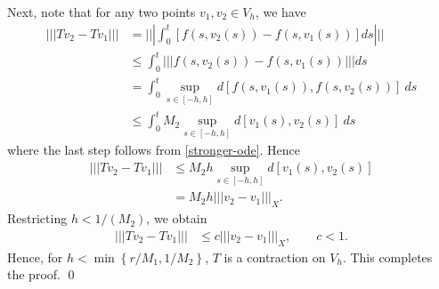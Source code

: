 \documentclass[12pt,reqno]{amsart}
\numberwithin{equation}{section}  %
\numberwithin{figure}{section}
\theoremstyle{plain}
\theoremstyle{definition}
\theoremstyle{remark}
\begin{document}
%
%
Next, note that for any two points $v_1, v_2 \in
V_h$, we have
%
%
\begin{equation}
	\label{cont-part-1}
	\begin{split}
		| | | Tv_2 - Tv_1 | | | 
		& = | | | \int_0^t \left[ f(s, v_2(s) ) - f(s, v_1 (s) ) \right]ds | | |
		\\
		& \le \int_0^t | | | f(s, v_2(s) ) - f(s, v_1 (s) ) | | | ds
		\\
		& = \int_0^t \sup_{s \in [-h, h]} d[f(s, v_1(s) ), f(s, v_2 (s) )] \ ds
		\\
		& \le \int_0^t M_2 \sup_{s \in [-h, h]} d[v_1(s), v_2 (s)] \
		ds
		\end{split}
\end{equation}
%
%
where the last step follows from \eqref{stronger-ode}.
Hence
\begin{equation*}
	\begin{split}
		| | | Tv_2 - Tv_1 | | | 
		& \le M_2 h \sup_{s \in [-h, h]} d[v_1(s), v_2 (s)]
		\\
		& = M_2 h   | | | v_2 - v_1 | | |_X.  
	\end{split}
\end{equation*}
%
%
Restricting $h < 1/(M_2)$, we obtain
\begin{equation*}
	\begin{split}
		| | | Tv_2 - Tv_1 | | | & \le c | | | v_2 - v_1 | | |_X, \qquad c <1. 
	\end{split}
\end{equation*}
Hence, for $h < \min\left\{r/M_1, 1/M_2  \right\}$, $T$ is a contraction on
$V_h$.  This completes \\ the proof. \qed
%
%
\appendix
\end{document}
